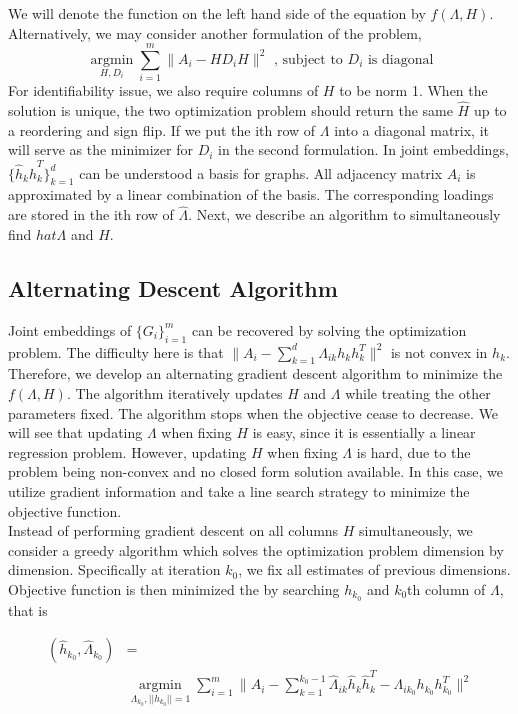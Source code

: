 \documentclass[10pt,journal,compsoc]{IEEEtran}
\begin{document}
\noindent  We will denote the function on the left hand side of the equation by $f(\Lambda,H)$. Alternatively, we may consider another formulation of the problem, 
\[  \underset{H,D_i}{\operatorname{argmin}} \sum\limits_{i=1}^{m} \| A_i- H D_i H \|  ^2  \text{ , subject to $D_i$ is diagonal}\]
For identifiability issue, we also require columns of $H$ to be norm 1. When the solution is unique, the two optimization problem should return the same $\hat{H}$ up to a reordering and sign flip. If we put the ith row of $\Lambda$ into a diagonal matrix, it will serve as the minimizer for $D_i$ in the second formulation. In joint embeddings, $\{\hat{h}_k \hat{h}_k^T\}_{k=1}^d$ can be understood a basis for graphs. All adjacency matrix $A_i$ is approximated by a linear combination of the basis. The corresponding loadings are stored in the ith row of $\hat{\Lambda}$. Next, we describe an algorithm to simultaneously find $hat{\Lambda}$ and $\hat{H}$.  

\subsection{Alternating Descent Algorithm}
\noindent Joint embeddings of $\{G_i \} _{i=1}^{m}$ can be recovered by solving the optimization problem. The difficulty here is that $\| A_i- \sum\limits_{k=1}^{d} \Lambda_{ik} h_k h_k^T \|  ^2$ is not convex in $h_k$. Therefore, we develop an alternating gradient descent algorithm to minimize the $f(\Lambda,H)$. The algorithm iteratively updates $H$ and $\Lambda$ while treating the other parameters fixed. The algorithm stops when the objective cease to decrease. We will see that updating $\Lambda$ when fixing $H$ is easy, since it is essentially a linear regression problem. However, updating $H$ when fixing $\Lambda$ is hard, due to the problem being non-convex and no closed form solution available. In this case, we utilize gradient information and take a line search strategy to minimize the objective function.  \\

\noindent Instead of performing gradient descent on all columns $H$ simultaneously, we consider a greedy algorithm which solves the optimization problem dimension by dimension. Specifically at iteration $k_0$, we fix all estimates of previous dimensions. Objective function is then minimized the  by searching $h_{k_0}$ and $k_0$th column of $\Lambda$, that is

\begin{align*}(\hat{h}_{k_0},\hat{\Lambda}_{k_0}) &= \\
&\underset{\Lambda_{k_0},||h_{k_0}||=1}{\operatorname{argmin}} \sum\limits_{i=1}^{m} \| A_i- \sum\limits_{k=1}^{k_0-1} \hat{\Lambda}_{ik} \hat{h}_{k} \hat{h}_{k}^T -\Lambda_{ik_0} h_{k_0} h_{k_0}^T\|  ^2
\end{align*} 
\end{document}
